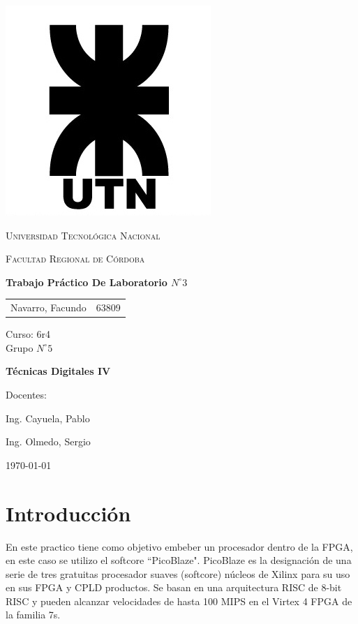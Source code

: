 \documentclass[11pt, a4paper]{article}
\begin{document}
\begin{titlepage}
 \centering
	\includegraphics[scale=0.80]{Imagenes/LOGO.jpg} \par
 	\vspace{1cm}
 	{\scshape\LARGE Universidad Tecnológica Nacional \par}
 	{\scshape\large Facultad Regional de Córdoba \par}
 	\vspace{1cm}
	{\bfseries \Large Trabajo Práctico De Laboratorio $N^{\circ} 3$\par}
 	\vspace{1.5cm}

	\begin{tabular}{ll}
		Navarro, Facundo		&	63809 	
	\end{tabular}
	
	\vspace{1cm}
	Curso: 6r4 \\
	Grupo $N^{\circ} 5$
 	\vfill
	{\bfseries \Large Técnicas Digitales IV\par}

	\vspace{1.5cm}
	Docentes: \par
	Ing. Cayuela, Pablo \par
	Ing. Olmedo, Sergio \par

 	\vfill
	{\large \today\par}
\end{titlepage}
	
	
\tableofcontents
\clearpage

\section{Introducción}
	En este practico tiene como objetivo embeber un procesador dentro de la FPGA, en este caso se utilizo el softcore ``PicoBlaze".  PicoBlaze es la designación de una serie de tres gratuitas procesador suaves (softcore) núcleos de Xilinx para su uso en sus FPGA y CPLD productos. Se basan en una arquitectura RISC de 8-bit RISC y pueden alcanzar velocidades de hasta 100 MIPS en el Virtex 4 FPGA de la familia 7s. 
\end{document}
